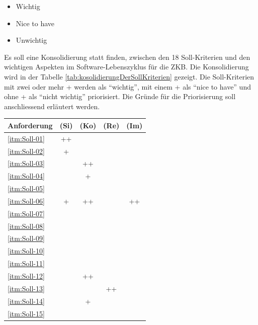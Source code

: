   \begin{itemize}
    \item Wichtig
    \item Nice to have
    \item Unwichtig
  \end{itemize}
  
  \noindent
  Es soll eine Konsolidierung statt finden, zwischen den 18 Soll-Kriterien und
  den wichtigen Aspekten im Software-Lebenszyklus für die \ac{ZKB}. Die
  Konsolidierung wird in der Tabelle \ref{tab:kosolidierungDerSollKriterien}
  gezeigt. Die Soll-Kriterien mit zwei oder mehr + werden als ``wichtig'', mit
  einem + als ``nice to have'' und ohne + als ``nicht wichtig'' priorisiert. Die
  Gründe für die Priorisierung soll anschliessend erläutert werden.
  
  \begin{table}[htb]
    \sffamily 
    \begin{center}
      \begin{threeparttable}
        \begin{tabular}{p{9cm}cccc}
          \toprule
          Anforderung & (Si) & (Ko) & (Re) & (Im)\\
          \midrule
          \ref{itm:Soll-01} & ++ &    &    &    \\
          \ref{itm:Soll-02} & +  &    &    &    \\
          \ref{itm:Soll-03} &    & ++ &    &    \\
          \ref{itm:Soll-04} &    & +  &    &    \\
          \ref{itm:Soll-05} &    &    &    &    \\
          \ref{itm:Soll-06} & +  & ++ &    & ++ \\
          \ref{itm:Soll-07} &    &    &    &    \\
          \ref{itm:Soll-08} &    &    &    &    \\
          \ref{itm:Soll-09} &    &    &    &    \\
          \ref{itm:Soll-10} &    &    &    &    \\
          \ref{itm:Soll-11} &    &    &    &    \\
          \ref{itm:Soll-12} &    & ++ &    &    \\
          \ref{itm:Soll-13} &    &    & ++ &    \\
          \ref{itm:Soll-14} &    & +  &    &    \\
          \ref{itm:Soll-15} &    &    &    &    \\

\end{tabular}
\end{threeparttable}
\end{center}
\end{table}
